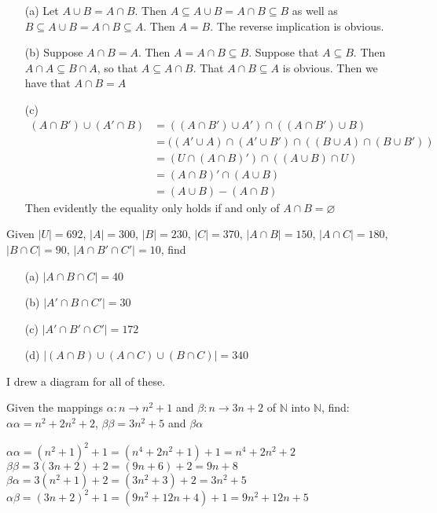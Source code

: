 \answer
\begin{itemize}
    \item[(a)]
        Let $A \cup B = A \cap B$. Then $A \subseteq A \cup B = A \cap B \subseteq B$ as well as $B \subseteq A \cup B = A \cap B \subseteq A$. Then $A = B$. The reverse implication is obvious.
    \item[(b)]
        Suppose $A \cap B = A$. Then $A = A \cap B \subseteq B$. Suppose that $A \subseteq B$. Then $A \cap A \subseteq B \cap A$, so that $A \subseteq A \cap B$. That $A \cap B \subseteq A$ is obvious. Then we have that $A \cap B = A$
    \item[(c)]
        \begin{align*}
            (A \cap B') \cup (A' \cap B) &= ((A \cap B') \cup A') \cap ((A \cap B') \cup B) \\
                                         &= ((A' \cup A) \cap (A' \cup B') \cap ((B \cup A) \cap (B \cup B')) \\
                                         &= (U \cap (A \cap B)') \cap ((A \cup B) \cap U) \\
                                         &= (A \cap B)' \cap (A \cup B) \\
                                         &= (A \cup B) - (A \cap B)
        \end{align*}
        Then evidently the equality only holds if and only of $A \cap B = \varnothing$
\end{itemize}


\exercise
Given $|U| = 692$, $|A| = 300$, $|B| = 230$, $|C| = 370$, $|A \cap B| = 150$, $|A \cap C| = 180$, $|B \cap C| = 90$, $|A \cap B' \cap C'| = 10$, find
\begin{itemize}
    \item[(a)]
        $|A \cap B \cap C| = 40$
    \item[(b)]
        $|A' \cap B \cap C'| = 30$
    \item[(c)]
        $|A' \cap B' \cap C'| = 172$
    \item[(d)]
        $|(A \cap B) \cup (A \cap C) \cup (B \cap C)| = 340$
\end{itemize}

\answer
I drew a diagram for all of these.


\exercise
Given the mappings $\alpha: n \to n^2+1$ and $\beta: n\to 3n+2$ of $\mathbb{N}$ into $\mathbb{N}$, find: $\alpha\alpha = n^2+2n^2+2$, $\beta\beta = 3n^2+5$ and $\beta\alpha$

\answer
$\alpha\alpha = (n^2+1)^2+1 = (n^4 + 2n^2 + 1) + 1 = n^4 + 2n^2 + 2$\\
$\beta\beta = 3(3n+2)+2 = (9n+6)+2 = 9n+8$ \\
$\beta\alpha = 3(n^2+1) + 2 = (3n^2 + 3) + 2 = 3n^2 + 5$ \\
$\alpha\beta = (3n+2)^2+1 = (9n^2 + 12n + 4) + 1 = 9n^2 + 12n + 5$


